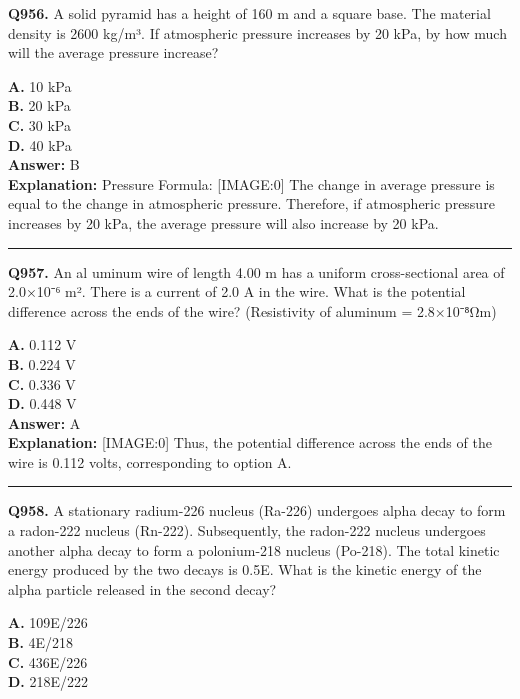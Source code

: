 \documentclass[12pt]{article}
\begin{document}
\noindent
\textbf{Q956.} A solid pyramid has a height of 160 m and a square base. The material density is 2600 kg/m³. If atmospheric pressure increases by 20 kPa, by how much will the average pressure increase?



\textbf{A.} 10 kPa \\
\textbf{B.} 20 kPa \\
\textbf{C.} 30 kPa \\
\textbf{D.} 40 kPa \\

\textbf{Answer:} B \\
\textbf{Explanation:} Pressure Formula:
[IMAGE:0]
The change in average pressure is equal to the change in atmospheric pressure. Therefore, if atmospheric pressure increases by 20 kPa, the average pressure will also increase by 20 kPa.

\hrule
\vspace{1em}


\noindent
\textbf{Q957.} An al
uminum wire of length 4.00 m has a uniform cross-sectional area of 2.0×10⁻⁶ m². There is a current of 2.0 A in the wire. What is the potential difference across the ends of the wire? (Resistivity of aluminum = 2.8×10⁻⁸Ω\cdot m)



\textbf{A.} 0.112 V \\
\textbf{B.} 0.224 V \\
\textbf{C.} 0.336 V \\
\textbf{D.} 0.448 V \\

\textbf{Answer:} A \\
\textbf{Explanation:} [IMAGE:0]
Thus, the potential difference across the ends of the wire is 0.112 volts, corresponding to option A.

\hrule
\vspace{1em}


\noindent
\textbf{Q958.} A stationary radium-226 nucleus (Ra-226) undergoes alpha decay to form a radon-222 nucleus (Rn-222). Subsequently, the radon-222 nucleus undergoes another alpha decay to form a polonium-218 nucleus (Po-218). The total kinetic energy produced by the two decays is 0.5E. What is the kinetic energy of the alpha particle released in the second decay?



\textbf{A.} 109E​/226 \\
\textbf{B.} 4E​/218 \\
\textbf{C.} 436E​/226 \\
\textbf{D.} 218E​/222 \\
\end{document}
